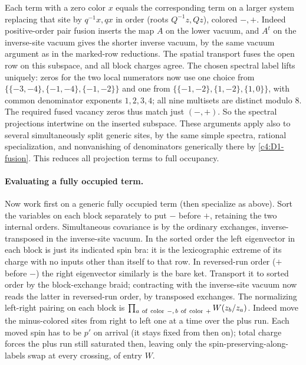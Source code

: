 Each term with a zero color \(x\) equals the corresponding term on a larger system replacing that site by \(q^{-1}x,qx\) in order (roots \(Q^{-1}z,Qz\)), colored \(-,+\). Indeed positive-order pair fusion inserts the map \(A\) on the lower vacuum, and \(A^t\) on the inverse-site vacuum gives the shorter inverse vacuum, by the same vacuum argument as in the marked-row reductions. The spatial transport fuses the open row on this subspace, and all block charges agree. The chosen spectral label lifts uniquely: zeros for the two local numerators now use one choice from \(\{\{-3,-4\},\{-1,-4\},\{-1,-2\}\}\) and one from \(\{\{-1,-2\},\{1,-2\},\{1,0\}\}\), with common denominator exponents \(1,2,3,4\); all nine multisets are distinct modulo 8. The required fused vacancy zeros thus match just \((-,+)\). So the spectral projections intertwine on the inserted subspace. These arguments apply also to several simultaneously split generic sites, by the same simple spectra, rational specialization, and nonvanishing of denominators generically there by \eqref{c4:D1-fusion}. This reduces all projection terms to full occupancy.

\paragraph{Evaluating a fully occupied term.} Now work first on a generic fully occupied term (then specialize as above). Sort the variables on each block separately to put \(-\) before \(+\), retaining the two internal orders. Simultaneous covariance is by the ordinary exchanges, inverse-transposed in the inverse-site vacuum. In the sorted order the left eigenvector in each block is just its indicated spin bra: it is the lexicographic extreme of its charge with no inputs other than itself to that row. In reversed-run order (\(+\) before \(-\)) the right eigenvector similarly is the bare ket. Transport it to sorted order by the block-exchange braid; contracting with the inverse-site vacuum now reads the latter in reversed-run order, by transposed exchanges. The normalizing left-right pairing on each block is
\(\prod_{a\ {\rm of\ color}\ -,\, b\ {\rm of\ color}\ +} W(z_b/z_a)\).
Indeed move the minus-colored sites from right to left one at a time over the plus run. Each moved spin has to be \(p'\) on arrival (it stays fixed from then on); total charge forces the plus run still saturated then, leaving only the spin-preserving-along-labels swap at every crossing, of entry \(W\).

